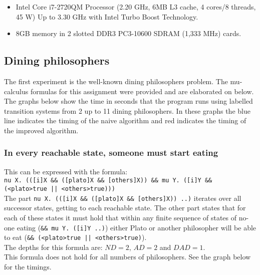 \documentclass[10pt,a4paper]{article}
\begin{document}
\begin{itemize}
	\item Intel Core i7-2720QM Processor (2.20 GHz, 6MB L3 cache, 4 cores/8 threads, 45 W) Up to 3.30 GHz with Intel Turbo Boost Technology.
	
	\item 8GB memory in 2 slotted DDR3 PC3-10600 SDRAM (1,333 MHz) cards.
\end{itemize}

\subsection{Dining philosophers}
The first experiment is the well-known dining philosophers problem. The mu-calculus formulas for this assignment were provided and are elaborated on below.\\
The graphs below show the time in seconds that the program runs using labelled transition systems from 2 up to 11 dining philosophers. In these graphs the blue line indicates the timing of the naive algorithm and red indicates the timing of the improved algorithm.

\subsubsection{In every reachable state, someone must start eating}
This can be expressed with the formula:\\
{\tt nu X. (([i]X \&\& ([plato]X \&\& [others]X)) \&\& mu Y. ([i]Y \&\& (<plato>true || <others>true)))}\\
The part {\tt nu X. (([i]X \&\& ([plato]X \&\& [others]X)) ..)} iterates over all successor states, getting to each reachable state. The other part states that for each of these states it must hold that within any finite sequence of states of no-one eating ({\tt \&\& mu Y. ([i]Y ..)}) either Plato or another philosopher will be able to eat ({\tt \&\& (<plato>true || <others>true)}).\\
The depths for this formula are: $ND = 2$, $AD = 2$ and $DAD = 1$.\\
This formula does not hold for all numbers of philosophers. See the graph below for the timings.\\

\end{document}
